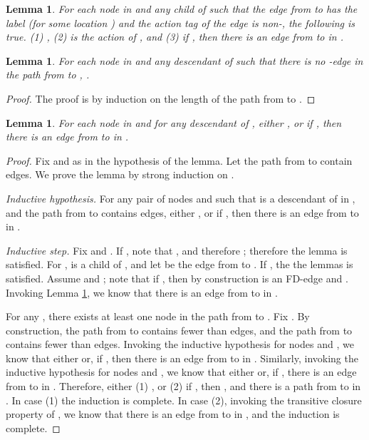 \documentclass[11pt]{article}
\numberwithin{theorem}{section}
\newtheorem{lemma}[theorem]{Lemma}
\begin{document}
\begin{lemma}\label{prop:FDchildVertexEdgeExists}
For each node  in  and any child  of  such that the edge  from  to
 has the label  (for some location ) and the action tag  of the edge is non-, the following
is true. (1) , (2)  is the action of , and (3) if , then there is an edge
from  to  in .
\end{lemma}

\begin{lemma}\label{prop:sameVertexTag}
For each node  in  and any descendant  of  such that there is no -edge in the path from  to , .
\end{lemma}
\begin{proof}
The proof is by induction on the length of the path from  to .
\end{proof}

\begin{lemma}\label{lem:descendantVertexTagEdge}
For each node  in  and for any descendant  of , either , or if , then there is an edge from  to  in .
\end{lemma}
\begin{proof}
Fix  and  as in the hypothesis of the lemma. Let the path from  to  contain  edges. We prove the lemma by strong induction on .

\emph{Inductive hypothesis.} For any pair of nodes  and  such that  is a descendant of  in , and the path from  to  contains  edges,  either , or if , then  there is an edge from  to  in .

\emph{Inductive step.} Fix  and . If , note that , and therefore ; therefore the lemma is satisfied. For ,  is a child of , and let  be the edge from  to . If , the the lemmas is satisfied. Assume  and ; note that if , then by construction  is an FD-edge and . Invoking Lemma \ref{prop:FDchildVertexEdgeExists}, we know that there is an edge from  to  in .


For any , there exists at least one node  in the path from  to . Fix . By construction, the path from  to  contains fewer than  edges, and the path from  to  contains fewer than  edges. Invoking the inductive hypothesis for nodes  and , we know that either  or, if , then there is an edge from  to  in . Similarly, invoking the inductive hypothesis for nodes  and , we know that either  or, if ,  there is an edge from  to  in . Therefore, either (1) , or (2) if , then , and there is a path from   to  in . In case (1) the induction is complete. In case (2), invoking the transitive closure property of , we know that there is an edge from  to  in , and the induction is complete.

\end{proof}
\end{document}
